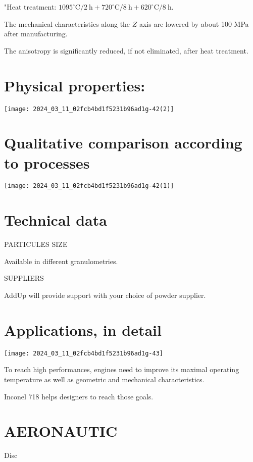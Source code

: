 \documentclass[10pt]{article}
\begin{document}
"Heat treatment: $1095^{\circ} \mathrm{C} / 2 \mathrm{~h}+720^{\circ} \mathrm{C} / 8 \mathrm{~h}+620^{\circ} \mathrm{C} / 8 \mathrm{~h}$.

The mechanical characteristics along the $Z$ axis are lowered by about 100 MPa after manufacturing.

The anisotropy is significantly reduced, if not eliminated, after heat treatment.

\section*{Physical properties:}
\begin{center}
\texttt{[image: 2024\_03\_11\_02fcb4bd1f5231b96ad1g-42(2)]}
\end{center}

\section*{Qualitative comparison according to processes}
\begin{center}
\texttt{[image: 2024\_03\_11\_02fcb4bd1f5231b96ad1g-42(1)]}
\end{center}

\section*{Technical data}
PARTICULES SIZE

Available in different granulometries.

SUPPLIERS

AddUp will provide support with your choice of powder supplier.

\section*{Applications, in detail }
\begin{center}
\texttt{[image: 2024\_03\_11\_02fcb4bd1f5231b96ad1g-43]}
\end{center}

To reach high performances, engines need to improve its maximal operating temperature as well as geometric and mechanical characteristics.

Inconel 718 helps designers to reach those goals.

\section*{AERONAUTIC}
Disc
\end{document}
